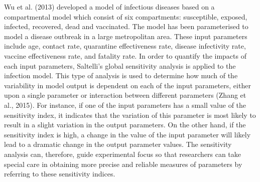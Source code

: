 \documentclass[smallextended]{svjour3}       %
\begin{document}
Wu et al. (2013) developed a model of infectious diseases based on a compartmental model
which consist of six compartments: susceptible, exposed, infected, recovered, dead and
vaccinated. The model has been parameterised to model a disease outbreak in a large
metropolitan area. These input parameters include age, contact rate, quarantine effectiveness
rate, disease infectivity rate, vaccine effectiveness rate, and fatality rate. In order to quantify
the impacts of each input parameters, Saltelli’s global sensitivity analysis is applied to the
infection model. This type of analysis is used to determine how much of the variability in model
output is dependent on each of the input parameters, either upon a single parameter or
interaction between different parameters (Zhang et al., 2015). For instance, if one of the input
parameters has a small value of the sensitivity index, it indicates that the variation of this
parameter is most likely to result in a slight variation in the output parameters. On the other
hand, if the sensitivity index is high, a change in the value of the input parameter will likely lead
to a dramatic change in the output parameter values. The sensitivity analysis can, therefore,
guide experimental focus so that researchers can take special care in obtaining more precise
and reliable measures of parameters by referring to these sensitivity indices.
\end{document}

